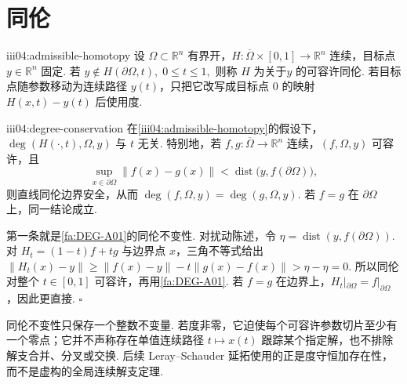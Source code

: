 \section{同伦}\label{sec:iii04-homotopy}

\begin{FADefinition}[B][可容许同伦]{iii04:admissible-homotopy}
设 \(\displaystyle\Omega\subset\mathbb R^n\) 有界开，\(\displaystyle H:\overline\Omega\times[0,1]\to\mathbb R^n\) 连续，目标点 \(\displaystyle y\in\mathbb R^n\) 固定. 若
\(\displaystyle y\notin H(\partial\Omega,t), \; 0\leqslant t\leqslant1,\)
则称 \(\displaystyle H\) 为关于\(\displaystyle y\) 的可容许同伦. 若目标点随参数移动为连续路径 \(\displaystyle y(t)\)，只把它改写成目标点 \(\displaystyle0\) 的映射 \(\displaystyle H(x,t)-y(t)\) 后使用度.
\end{FADefinition}

\begin{FAProposition}[B][度守恒与扰动稳定性]{iii04:degree-conservation}
在\autoref{iii04:admissible-homotopy}的假设下，\(\displaystyle\deg(H(\cdot,t),\Omega,y)\) 与 \(\displaystyle t\) 无关. 特别地，若 \(\displaystyle f,g:\overline\Omega\to\mathbb R^n\) 连续，\(\displaystyle(f,\Omega,y)\) 可容许，且
\[
\sup_{x\in\partial\Omega}\|f(x)-g(x)\|
<
\operatorname{dist}\bigl(y,f(\partial\Omega)\bigr),
\]
则直线同伦边界安全，从而 \(\displaystyle\deg(f,\Omega,y)=\deg(g,\Omega,y)\). 若 \(\displaystyle f=g\) 在 \(\displaystyle\partial\Omega\) 上，同一结论成立.
\end{FAProposition}

\begin{FAProof}
第一条就是\autoref{fa:DEG-A01}的同伦不变性. 对扰动陈述，令 \(\displaystyle\eta=\operatorname{dist}(y,f(\partial\Omega))\). 对 \(\displaystyle H_t=(1-t)f+tg\) 与边界点 \(\displaystyle x\)，三角不等式给出
\(\displaystyle \|H_t(x)-y\| \geqslant \|f(x)-y\|-t\|g(x)-f(x)\| > \eta-\eta=0.\)
所以同伦对整个 \(\displaystyle t\in[0,1]\) 可容许，再用\autoref{fa:DEG-A01}. 若 \(\displaystyle f=g\) 在边界上，\(\displaystyle H_t|_{\partial\Omega}=f|_{\partial\Omega}\)，因此更直接. \hfill\(\square\)
\end{FAProof}

\begin{FARemark}[度的延拓不等于连续解支]
同伦不变性只保存一个整数不变量. 若度非零，它迫使每个可容许参数切片至少有一个零点；它并不声称存在单值连续路径 \(\displaystyle t\mapsto x(t)\) 跟踪某个指定解，也不排除解支合并、分叉或交换. 后续 Leray--Schauder 延拓使用的正是度守恒加存在性，而不是虚构的全局连续解支定理.
\end{FARemark}

